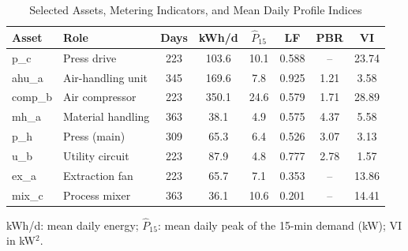\begin{table}[!t]
\caption{Selected Assets, Metering Indicators, and Mean Daily Profile Indices}
\label{tab:assets}
\centering
\footnotesize
\setlength{\tabcolsep}{3pt}
\begin{tabular}{llcccccc}
\toprule
\textbf{Asset} & \textbf{Role} & \textbf{Days} & \textbf{kWh/d} & \textbf{$\hat{P}_{15}$} & \textbf{LF} & \textbf{PBR} & \textbf{VI} \\
\midrule
p\_c & Press drive & 223 & 103.6 & 10.1 & 0.588 & -- & 23.74 \\
ahu\_a & Air-handling unit & 345 & 169.6 & 7.8 & 0.925 & 1.21 & 3.58 \\
comp\_b & Air compressor & 223 & 350.1 & 24.6 & 0.579 & 1.71 & 28.89 \\
mh\_a & Material handling & 363 & 38.1 & 4.9 & 0.575 & 4.37 & 5.58 \\
p\_h & Press (main) & 309 & 65.3 & 6.4 & 0.526 & 3.07 & 3.13 \\
u\_b & Utility circuit & 223 & 87.9 & 4.8 & 0.777 & 2.78 & 1.57 \\
ex\_a & Extraction fan & 223 & 65.7 & 7.1 & 0.353 & -- & 13.86 \\
mix\_c & Process mixer & 363 & 36.1 & 10.6 & 0.201 & -- & 14.41 \\
\bottomrule
\end{tabular}
\par\vspace{2pt}\begin{minipage}{0.97\columnwidth}\footnotesize kWh/d: mean daily energy; $\hat{P}_{15}$: mean daily peak of the 15-min demand (kW); VI in kW$^2$.\end{minipage}
\end{table}
